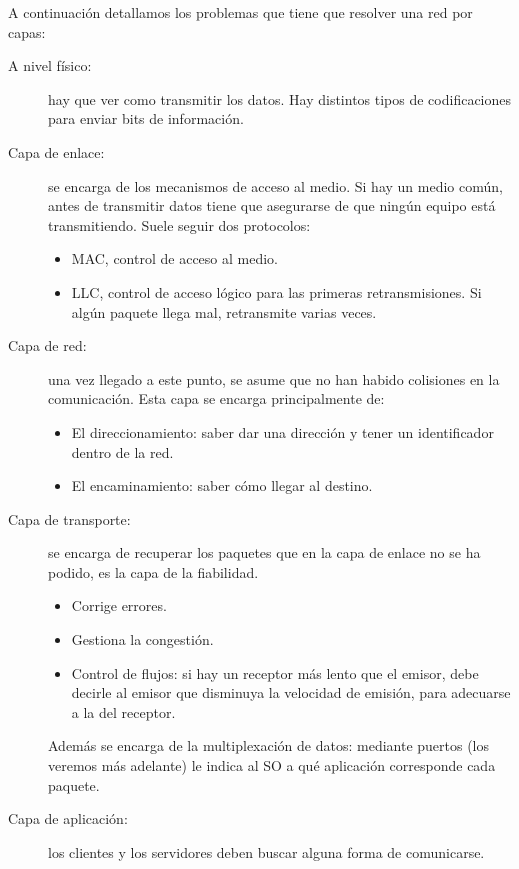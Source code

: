 A continuación detallamos los problemas que tiene que resolver una red por capas: 
\begin{description}
    \item [A nivel físico:] hay que ver como transmitir los datos. Hay distintos tipos de codificaciones para enviar bits de información. 
    \item [Capa de enlace:] se encarga de los mecanismos de acceso al medio. Si hay un medio común, antes de transmitir datos tiene que asegurarse de que ningún equipo está transmitiendo. Suele seguir dos protocolos: 
        \begin{itemize}
            \item MAC, control de acceso al medio.
            \item LLC, control de acceso lógico para las primeras retransmisiones. Si algún paquete llega mal, retransmite varias veces. 
        \end{itemize}
    
    \item [Capa de red:] una vez llegado a este punto, se asume que no han habido colisiones en la comunicación. Esta capa se encarga principalmente de: 
        \begin{itemize}
            \item El direccionamiento: saber dar una dirección y tener un identificador dentro de la red. 
            \item El encaminamiento: saber cómo llegar al destino. 
        \end{itemize}

    \item [Capa de transporte:] se encarga de recuperar los paquetes que en la capa de enlace no se ha podido, es la capa de la fiabilidad. 
        \begin{itemize}
            \item Corrige errores.
            \item Gestiona la congestión. 
            \item Control de flujos: si hay un receptor más lento que el emisor, debe decirle al emisor que disminuya la velocidad de emisión, para adecuarse a la del receptor. 
        \end{itemize}
    Además se encarga de la multiplexación de datos: mediante puertos (los veremos más adelante) le indica al SO a qué aplicación corresponde cada paquete. 
    \item [Capa de aplicación:] los clientes y los servidores deben buscar alguna forma de comunicarse. 
\end{description}

